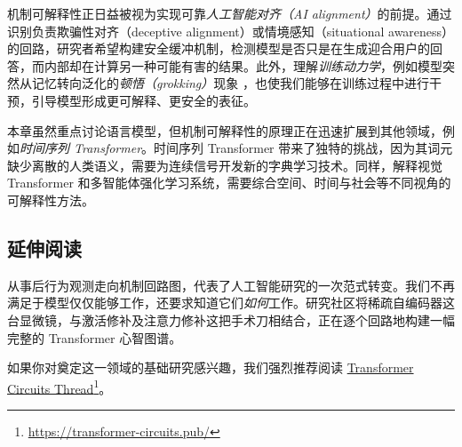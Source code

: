 机制可解释性正日益被视为实现可靠\emph{人工智能对齐（AI alignment）}的前提。通过识别负责欺骗性对齐（deceptive alignment）或情境感知（situational awareness）的回路，研究者希望构建安全缓冲机制，检测模型是否只是在生成迎合用户的回答，而内部却在计算另一种可能有害的结果。此外，理解\emph{训练动力学}，例如模型突然从记忆转向泛化的\emph{顿悟（grokking）}现象 \citep{nanda2023progress}，也使我们能够在训练过程中进行干预，引导模型形成更可解释、更安全的表征。

本章虽然重点讨论语言模型，但机制可解释性的原理正在迅速扩展到其他领域，例如\emph{时间序列 Transformer}\citep{kalnare2026}。时间序列 Transformer 带来了独特的挑战，因为其词元缺少离散的人类语义，需要为连续信号开发新的字典学习技术。同样，解释视觉 Transformer 和多智能体强化学习系统，需要综合空间、时间与社会等不同视角的可解释性方法。


\subsection{延伸阅读}
从事后行为观测走向机制回路图，代表了人工智能研究的一次范式转变。我们不再满足于模型仅仅能够工作，还要求知道它们\emph{如何}工作。研究社区将稀疏自编码器这台显微镜，与激活修补及注意力修补这把手术刀相结合，正在逐个回路地构建一幅完整的 Transformer 心智图谱。


\begin{tcolorbox}[
    colback=blue!10!white,
    colframe=blue!85!black,
    title={\faExclamationCircle\quad 延伸阅读},
    fonttitle=\bfseries,
    coltitle=white,
    boxrule=1pt,
    arc=4pt,
    left=5pt,
    right=5pt,
    top=5pt,
    bottom=5pt,
    enhanced
]
如果你对奠定这一领域的基础研究感兴趣，我们强烈推荐阅读 \href{https://transformer-circuits.pub/}{Transformer Circuits Thread}\footnote{\url{https://transformer-circuits.pub/}}。
\end{tcolorbox}





